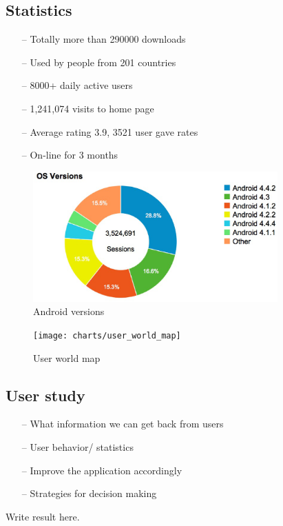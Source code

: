 \subsection{Statistics}
\begin{itemize}
\item[--]Totally more than 290000 downloads
\item[--]Used by people from 201 countries
\item[--]8000+ daily active users
\item[--]1,241,074 visits to home page
\item[--]Average rating 3.9, 3521 user gave rates
\item[--]On-line for 3 months
\end{itemize}
\begin{figure}[htb]
\centering \includegraphics[height=5cm]{charts/android_versions}
\caption{Android versions \label{chart6}}
\end{figure}

\begin{figure}[htb]
\centering \texttt{[image: charts/user\_world\_map]}
\caption{User world map \label{chart7}}
\end{figure}

\begin{table}[htb]
\caption{Receiver type statistic \label{Table8}}
\begin{center}
\end{center}
\end{table}


\subsection{User study}
\begin{itemize}
\item[--]What information we can get back from users
\item[--]User behavior/ statistics
\item[--]Improve the application accordingly
\item[--]Strategies for decision making
\end{itemize}
Write result here.